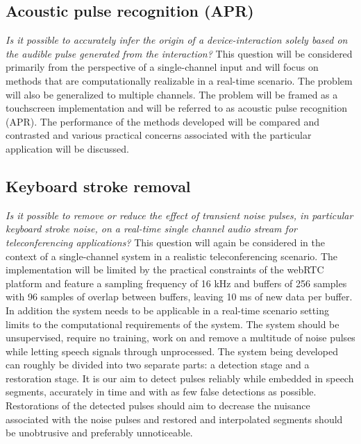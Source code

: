\subsection{Acoustic pulse recognition (APR)}
\emph{Is it possible to accurately infer the origin of a device-interaction solely based on the audible pulse generated from the interaction?}
This question will be considered primarily from the perspective of a single-channel input and will focus on methods that are computationally realizable in a real-time scenario. The problem will also be generalized to multiple channels. The problem will be framed as a touchscreen implementation and will be referred to as acoustic pulse recognition (APR). The performance of the methods developed will be compared and contrasted and various practical concerns associated with the particular application will be discussed.



\subsection{Keyboard stroke removal}
\emph{Is it possible to remove or reduce the effect of transient noise pulses, in particular keyboard stroke noise, on a real-time single channel audio stream for teleconferencing applications?}
This question will again be considered in the context of a single-channel system in a realistic teleconferencing scenario. The implementation will be limited by the practical constraints of the webRTC platform and feature a sampling frequency of 16 kHz and buffers of 256 samples with 96 samples of overlap between buffers, leaving 10 ms of new data per buffer. In addition the system needs to be applicable in a real-time scenario setting limits to the computational requirements of the system. The system should be unsupervised, require no training, work on and remove a multitude of noise pulses while letting speech signals through unprocessed. The system being developed can roughly be divided into two separate parts: a detection stage and a restoration stage. It is our aim to detect pulses reliably while embedded in speech segments, accurately in time and with as few false detections as possible. Restorations of the detected pulses should aim to decrease the nuisance associated with the noise pulses and restored and interpolated segments should be unobtrusive and preferably unnoticeable.

